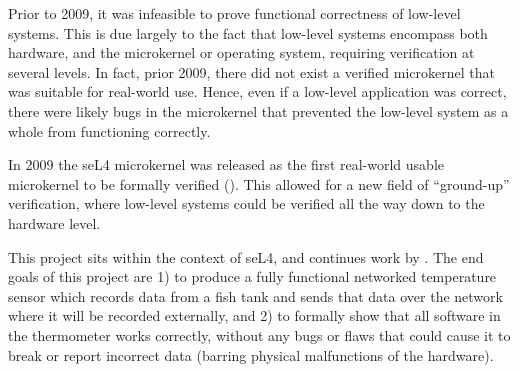 \documentclass[twoside]{memoir}
\begin{document}
Prior to 2009, it was infeasible to prove functional correctness of
low-level systems.
This is due largely to the fact that low-level systems
encompass both hardware, and the microkernel or operating system,
requiring verification at several levels.
In fact, prior 2009, there did not exist a verified microkernel
that was suitable for real-world use.
Hence, even if a low-level application was correct,
there were likely bugs in the microkernel that prevented the low-level system
as a whole from functioning correctly.

In 2009 the seL4 microkernel was released as the first real-world usable
microkernel to be formally verified (\cite{Klein2014Verification}).
This allowed for a new field of ``ground-up'' verification,
where low-level systems could be verified all the way down to the hardware level.

This project sits within the context of seL4, and
continues work by \cite{Wilde2024Network}.
The end goals of this project are 1) to produce a fully functional
networked temperature sensor which records data from a fish tank
and sends that data over the network where it will be recorded externally, and 2)
to formally show that all software in the
thermometer works correctly, without any bugs or flaws that could cause
it to break or report incorrect data (barring physical malfunctions of the hardware).
\end{document}
